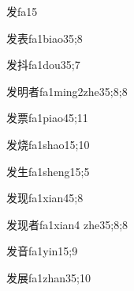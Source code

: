 
\begin{verbete}{发}{fa1}{5}
\end{verbete}

\begin{verbete}{发表}{fa1biao3}{5;8}
\end{verbete}

\begin{verbete}{发抖}{fa1dou3}{5;7}
\end{verbete}

\begin{verbete}{发明者}{fa1ming2zhe3}{5;8;8}
\end{verbete}

\begin{verbete}{发票}{fa1piao4}{5;11}
\end{verbete}

\begin{verbete}{发烧}{fa1shao1}{5;10}
\end{verbete}

\begin{verbete}{发生}{fa1sheng1}{5;5}
\end{verbete}

\begin{verbete}{发现}{fa1xian4}{5;8}
\end{verbete}

\begin{verbete}{发现者}{fa1xian4 zhe3}{5;8;8}
\end{verbete}

\begin{verbete}{发音}{fa1yin1}{5;9}
\end{verbete}

\begin{verbete}{发展}{fa1zhan3}{5;10}
\end{verbete}

